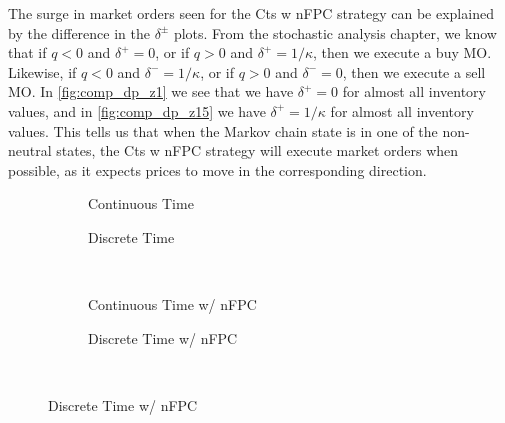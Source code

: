  The surge in market orders seen for the Cts w nFPC strategy can be explained by the difference in the $\delta^\pm$ plots. From the stochastic analysis chapter, we know that if $q < 0 $ and $\delta^+ =0$, or if $q > 0$ and $\delta^+ = 1/\kappa$, then we execute a buy MO. Likewise, if $q < 0 $ and $\delta^- =1/\kappa$, or if $q > 0$ and $\delta^- = 0$, then we execute a sell MO. In \autoref{fig:comp_dp_z1} we see that we have $\delta^+ = 0$ for almost all inventory values, and in \autoref{fig:comp_dp_z15} we have  $\delta^+ = 1/\kappa$ for almost all inventory values. This tells us that when the Markov chain state is in one of the non-neutral states, the Cts w nFPC strategy will execute market orders when possible, as it expects prices to move in the corresponding direction.

\begin{figure}
\centering
\begin{subfigure}{.45\linewidth}
  \centering
  \setlength\figureheight{\linewidth} 
  \setlength\figurewidth{\linewidth}
  
  \caption{Continuous Time}
\end{subfigure}%
\hfill%
\begin{subfigure}{.45\linewidth}
  \centering
  \setlength\figureheight{\linewidth} 
  \setlength\figurewidth{\linewidth}
   
  \caption{Discrete Time}
\end{subfigure}\\
\vspace{1cm}
\begin{subfigure}{.45\linewidth}
  \centering
  \setlength\figureheight{\linewidth} 
  \setlength\figurewidth{\linewidth}
   
  \caption{Continuous Time w/ nFPC}
\end{subfigure}%
\hfill%
\begin{subfigure}{.45\linewidth}
  \centering
  \setlength\figureheight{\linewidth} 
  \setlength\figurewidth{\linewidth}
   
  \caption{Discrete Time w/ nFPC}
\end{subfigure}\\

\leavevmode{}\hspace{0pt plus 1filll}\null


\end{figure}
